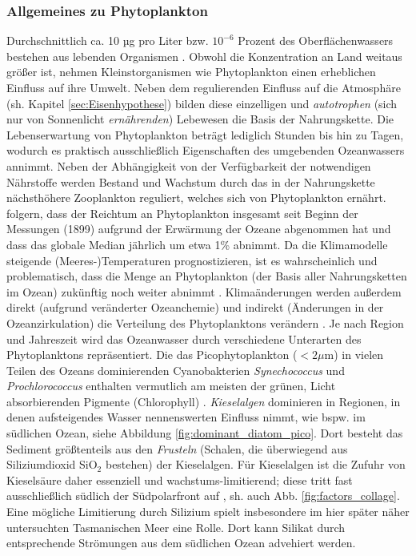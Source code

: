 \documentclass[12pt,a4paper,onecolumn,headheight=30pt]{scrartcl}
\begin{document}
\subsubsection{Allgemeines zu Phytoplankton} \label{sec:Phytobasics}
Durchschnittlich ca. 10 µg pro Liter bzw. $10^{-6}$ Prozent des Oberflächenwassers bestehen aus lebenden Organismen \citep{Emerson.2009}. Obwohl die Konzentration an Land weitaus größer ist, nehmen Kleinstorganismen wie Phytoplankton einen erheblichen Einfluss auf ihre Umwelt. Neben dem regulierenden Einfluss auf die Atmosphäre (sh. Kapitel \ref{sec:Eisenhypothese}) bilden diese einzelligen und \textit{autotrophen} (sich nur von Sonnenlicht \textit{ernährenden}) Lebewesen die Basis der Nahrungskette. Die Lebenserwartung von Phytoplankton beträgt lediglich Stunden bis hin zu Tagen, wodurch es praktisch ausschließlich Eigenschaften des umgebenden Ozeanwassers annimmt. Neben der Abhängigkeit von der Verfügbarkeit der notwendigen Nährstoffe werden Bestand und Wachstum durch das in der Nahrungskette nächsthöhere Zooplankton reguliert, welches sich von Phytoplankton ernährt. \citet{Boyce.2010} folgern, dass der Reichtum an Phytoplankton insgesamt seit Beginn der Messungen (1899) aufgrund der Erwärmung der Ozeane abgenommen hat und dass das globale Median jährlich um etwa 1\% abnimmt. Da die Klimamodelle steigende (Meeres-)Temperaturen prognostizieren, ist es wahrscheinlich und problematisch, dass die Menge an Phytoplankton (der Basis aller Nahrungsketten im Ozean) zukünftig noch weiter abnimmt \citep{Siegel.2010}. Klimaänderungen werden außerdem direkt (aufgrund veränderter Ozeanchemie) und indirekt (Änderungen in der Ozeanzirkulation) die Verteilung des Phytoplanktons verändern \citep{Falkowski.1998}. Je nach Region und Jahreszeit wird das Ozeanwasser durch verschiedene Unterarten des Phytoplanktons repräsentiert. Die das Picophytoplankton ($<2\mu$m) in vielen Teilen des Ozeans dominierenden Cyanobakterien \textit{Synechococcus} und \textit{Prochlorococcus} enthalten vermutlich am meisten der grünen, Licht absorbierenden Pigmente (Chlorophyll) \citep{Emerson.2009}. \textit{Kieselalgen} dominieren in Regionen, in denen aufsteigendes Wasser nennenswerten Einfluss nimmt, wie bspw. im südlichen Ozean, siehe Abbildung \ref{fig:dominant_diatom_pico}. Dort besteht das Sediment größtenteils aus den \textit{Frusteln} (Schalen, die überwiegend aus Siliziumdioxid SiO$_2$ bestehen) der Kieselalgen. Für Kieselalgen ist die Zufuhr von Kieselsäure daher essenziell und wachstums-limitierend; diese tritt fast ausschließlich südlich der Südpolarfront auf \citep{Falkowski.1998}, sh. auch Abb. \ref{fig:factors_collage}. Eine mögliche Limitierung durch Silizium spielt insbesondere im  hier später näher untersuchten Tasmanischen Meer eine Rolle. Dort kann Silikat durch entsprechende Strömungen aus dem südlichen Ozean advehiert werden.
\end{document}
